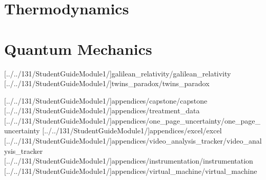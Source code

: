 \documentclass[english,twoside]{article}
\begin{document}
\part{Thermodynamics}


\part{Quantum Mechanics}



[../../131/StudentGuideModule1/]{galilean_relativity/galilean_relativity} %
[../../131/StudentGuideModule1/]{twins_paradox/twins_paradox}

\startappendix

[../../131/StudentGuideModule1/]{appendices/capstone/capstone}
[../../131/StudentGuideModule1/]{appendices/treatment_data}
[../../131/StudentGuideModule1/]{appendices/one_page_uncertainty/one_page_uncertainty}
[../../131/StudentGuideModule1/]{appendices/excel/excel}
[../../131/StudentGuideModule1/]{appendices/video_analysis_tracker/video_analysis_tracker}
[../../131/StudentGuideModule1/]{appendices/instrumentation/instrumentation}
[../../131/StudentGuideModule1/]{appendices/virtual_machine/virtual_machine}
\end{document}
